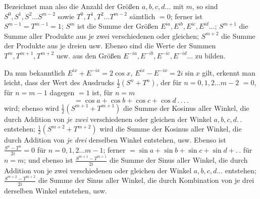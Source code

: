Bezeichnet man also die Anzahl der Größen $a,b,c,d\ldots$ mit $m$, so sind $S^0,S^1,S^2\ldots S^{m-2}$ sowie $T^0,T^1,T^2\ldots T^{m-2}$ sämtlich $=0$; ferner ist $S^{m-1}=T^{m-1}=1$; $S^m$ ist die Summe der Größen $E^{ia},E^{ib},E^{ic},E^{id}\ldots$; $S^{m+1}$ die Summe aller Produkte aus je zwei verschiedenen oder gleichen; $S^{m+2}$ die Summe der Produkte aus je dreien usw. Ebenso sind die Werte der Summen $T^m,T^{m+1},T^{m+2}$ usw. aus den Größen $E^{-ia},E^{-ib},E^{-ic},E^{-id}\ldots$ zu bilden.

Da nun bekanntlich $E^{ix}+E^{-ix}=2\cos x$, $E^{ix}-E^{-ix}=2i\sin x$ gilt, erkennt man leicht, dass der Wert des Ausdrucks $\frac12(S^n+T^n)$, der für $n=0,1,2\ldots m-2$ $=0$, für $n=m-1$ dagegen $=1$ ist, für $n=m$
\[
=\cos a+\cos b+\cos c+\cos d\,.\,.\,.\,.
\]
wird; ebenso wird $\frac12(S^{m+1}+T^{m+1})$ die Summe der Kosinus aller Winkel, die durch Addition von \textit{je zwei} verschiedenen oder gleichen der Winkel $a,b,c,d.\,.$ entstehen; $\frac12(S^{m+2}+T^{m+2})$ wird die Summe der Kosinus aller Winkel, die durch Addition von \textit{je drei} derselben Winkel entstehen, usw. Ebenso ist $\frac{S^n-T^n}{2i}=0$ für $n=0,1,2\ldots m-1$; ferner $=\sin a+\sin b+\sin c+\sin d+.\,.$ für $n=m$; und ebenso ist $\frac{S^{m+1}-T^{m+1}}{2i}$ die Summe der Sinus aller Winkel, die durch Addition von je zwei verschiedenen oder gleichen der Winkel $a,b,c,d\ldots$ entstehen; $\frac{S^{m+2}-T^{m+2}}{2i}$ die Summe der Sinus aller Winkel, die durch Kombination von je drei derselben Winkel entstehen, usw.

